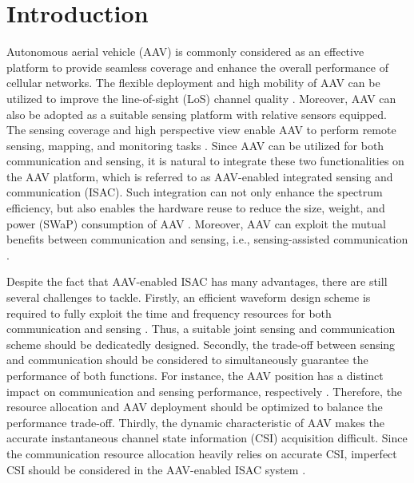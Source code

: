 \documentclass[twocolumn,journal]{IEEEtran}
\begin{document}
\section{Introduction}
Autonomous aerial vehicle (AAV) is commonly considered as an effective platform to provide seamless coverage and enhance the overall performance of cellular networks. The flexible deployment and high mobility of AAV can be utilized to improve the line-of-sight (LoS) channel quality \cite{zengWireless2016}. Moreover, AAV can also be adopted as a suitable sensing platform with relative sensors equipped. The sensing coverage and high perspective view enable AAV to perform remote sensing, mapping, and monitoring tasks \cite{muUAV2023}. Since AAV can be utilized for both communication and sensing, it is natural to integrate these two functionalities on the AAV platform, which is referred to as AAV-enabled integrated sensing and communication (ISAC). Such integration can not only enhance the spectrum efficiency, but also enables the hardware reuse to reduce the size, weight, and power (SWaP) consumption of AAV \cite{mengUAVEnabled2024}. Moreover, AAV can exploit the mutual benefits between communication and sensing, i.e., sensing-assisted communication \cite{huCollaborative2025}. 

Despite the fact that AAV-enabled ISAC has many advantages, there are still several challenges to tackle. Firstly, an efficient waveform design scheme is required to fully exploit the time and frequency resources for both communication and sensing \cite{chenJoint2023b}. Thus, a suitable joint sensing and communication scheme should be dedicatedly designed. Secondly, the trade-off between sensing and communication should be considered to simultaneously guarantee the performance of both functions. For instance, the AAV position has a distinct impact on communication and sensing performance, respectively \cite{huCollaborative2025}. Therefore, the resource allocation and AAV deployment should be optimized to balance the performance trade-off. 
Thirdly, the dynamic characteristic of AAV makes the accurate instantaneous channel state information (CSI) acquisition difficult. Since the communication resource allocation heavily relies on accurate CSI, imperfect CSI should be considered in the AAV-enabled ISAC system \cite{maoUAVAssisted2025}.
\end{document}
